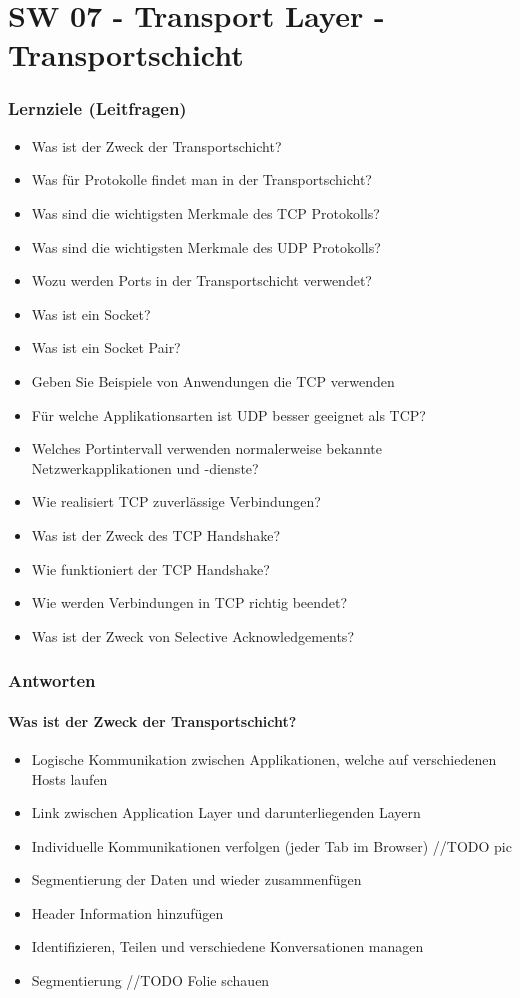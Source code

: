 \part{SW 07 - Transport Layer - Transportschicht}
\section{Lernziele (Leitfragen)}
\begin{itemize}
    \item Was ist der Zweck der Transportschicht?
    \item Was für Protokolle findet man in der Transportschicht?
    \item Was sind die wichtigsten Merkmale des TCP Protokolls?
    \item Was sind die wichtigsten Merkmale des UDP Protokolls?
    \item Wozu werden Ports in der Transportschicht verwendet?
    \item Was ist ein Socket?
    \item Was ist ein \flqq{}Socket Pair\frqq?
    \item Geben Sie Beispiele von Anwendungen die TCP verwenden
    \item Für welche Applikationsarten ist UDP besser geeignet als TCP?
    \item Welches Portintervall verwenden normalerweise bekannte Netzwerkapplikationen und -dienste?
    \item Wie realisiert TCP zuverlässige Verbindungen?
    \item Was ist der Zweck des TCP Handshake?
    \item Wie funktioniert der TCP Handshake?
    \item Wie werden Verbindungen in TCP richtig beendet?
    \item Was ist der Zweck von \flqq{}Selective Acknowledgements\frqq?
\end{itemize}

\section{Antworten}
\subsection*{Was ist der Zweck der Transportschicht?}
\begin{itemize}
    \item Logische Kommunikation zwischen Applikationen, welche auf verschiedenen Hosts laufen
    \item Link zwischen Application Layer und darunterliegenden Layern
    \item Individuelle Kommunikationen verfolgen (jeder Tab im Browser) //TODO pic
    \item Segmentierung der Daten und wieder zusammenfügen
    \item Header Information hinzufügen
    \item Identifizieren, Teilen und verschiedene Konversationen managen
    \item Segmentierung //TODO Folie schauen
\end{itemize}
